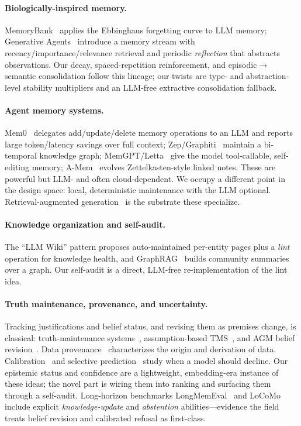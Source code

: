 \documentclass[11pt]{article}
\theoremstyle{definition}
\begin{document}
\paragraph{Biologically-inspired memory.}
MemoryBank~\cite{memorybank} applies the Ebbinghaus forgetting curve to LLM
memory; Generative Agents~\cite{generativeagents} introduce a memory stream with
recency/importance/relevance retrieval and periodic \emph{reflection} that
abstracts observations. Our decay, spaced-repetition reinforcement, and
episodic$\to$semantic consolidation follow this lineage; our twists are
type- and abstraction-level stability multipliers and an LLM-free extractive
consolidation fallback.

\paragraph{Agent memory systems.}
Mem0~\cite{mem0} delegates add/update/delete memory operations to an LLM and
reports large token/latency savings over full context; Zep/Graphiti~\cite{zep}
maintain a bi-temporal knowledge graph; MemGPT/Letta~\cite{memgpt} give the model
tool-callable, self-editing memory; A-Mem~\cite{amem} evolves Zettelkasten-style
linked notes. These are powerful but LLM- and often cloud-dependent. We occupy a
different point in the design space: local, deterministic maintenance with the
LLM optional. Retrieval-augmented generation~\cite{rag} is the substrate these
specialize.

\paragraph{Knowledge organization and self-audit.}
The ``LLM Wiki'' pattern proposes auto-maintained per-entity pages plus a
\emph{lint} operation for knowledge health, and GraphRAG~\cite{graphrag} builds
community summaries over a graph. Our self-audit is a direct, LLM-free
re-implementation of the lint idea.

\paragraph{Truth maintenance, provenance, and uncertainty.}
Tracking justifications and belief status, and revising them as premises change,
is classical: truth-maintenance systems~\cite{doyle}, assumption-based
TMS~\cite{atms}, and AGM belief revision~\cite{agm}. Data
provenance~\cite{provenance} characterizes the origin and derivation of data.
Calibration~\cite{calibration} and selective prediction~\cite{selective} study
when a model should decline. Our epistemic status and confidence are a
lightweight, embedding-era instance of these ideas; the novel part is wiring
them into ranking and surfacing them through a self-audit. Long-horizon
benchmarks LongMemEval~\cite{longmemeval} and LoCoMo~\cite{locomo} include
explicit \emph{knowledge-update} and \emph{abstention} abilities---evidence the
field treats belief revision and calibrated refusal as first-class.
\end{document}

